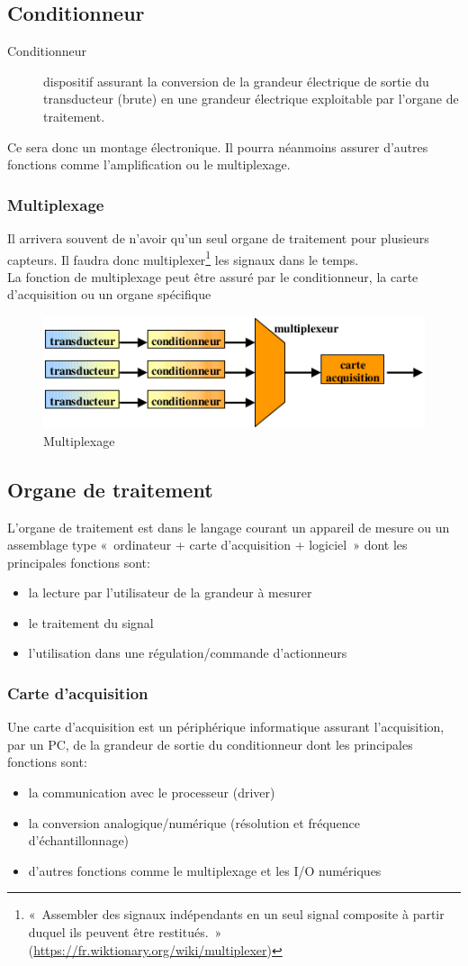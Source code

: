 \subsection{Conditionneur}
\begin{description}
	\item[Conditionneur] dispositif assurant la conversion de la grandeur électrique de sortie du transducteur (brute) en une grandeur électrique exploitable par l'organe de traitement.
\end{description}
Ce sera donc un montage électronique. Il pourra néanmoins assurer d'autres fonctions comme l'amplification ou le multiplexage.
\subsubsection{Multiplexage}
Il arrivera souvent de n'avoir qu'un seul organe de traitement pour plusieurs capteurs. Il faudra donc multiplexer\footnote{«~Assembler des signaux indépendants en un seul signal composite à partir duquel ils peuvent être restitués.~» (\url{https://fr.wiktionary.org/wiki/multiplexer})} les signaux dans le temps.\\
La fonction de multiplexage peut être assuré par le conditionneur, la carte d'acquisition ou un organe spécifique
\begin{figure}[H] 
	\centering 
	\includegraphics[width=.7\textwidth]{ch1/image2}
	\caption{Multiplexage}
\end{figure}
\subsection{Organe de traitement}
L'organe de traitement est dans le langage courant un appareil de mesure ou un assemblage type «~ordinateur + carte d'acquisition + logiciel~» dont les principales fonctions sont:
\begin{itemize}
	\item la lecture par l'utilisateur de la grandeur à mesurer
	\item le traitement du signal
	\item l'utilisation dans une régulation/commande
	d'actionneurs
\end{itemize}
\subsubsection{Carte d'acquisition}
Une carte d'acquisition est un périphérique informatique assurant l'acquisition, par un PC, de la grandeur de sortie du conditionneur dont les principales fonctions sont:
\begin{itemize}
	\item la communication avec le processeur (driver)
	\item la conversion analogique/numérique (résolution et fréquence d’échantillonnage)
	\item d'autres fonctions comme le multiplexage et les I/O numériques
\end{itemize}
